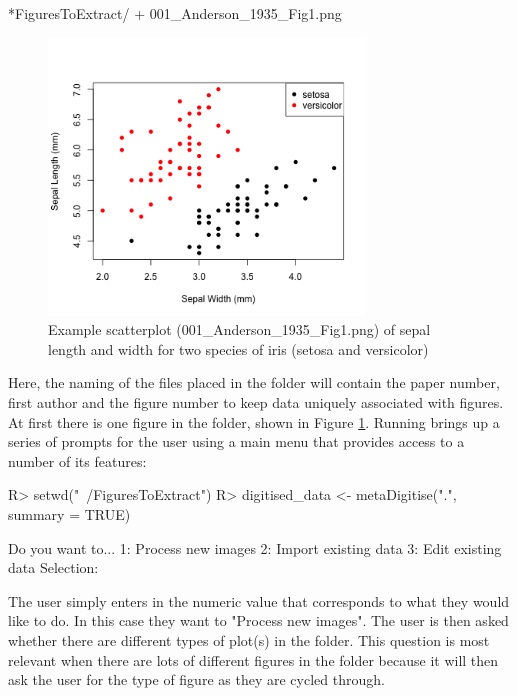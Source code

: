 \documentclass[article]{jss}
\newcommand{\fct}[1]{\code{#1()}}
\begin{document}
\begin{CodeChunk}
\begin{CodeOutput}
*FiguresToExtract/
    + 001_Anderson_1935_Fig1.png
\end{CodeOutput}
\end{CodeChunk}

\begin{figure}[!h] 
 \includegraphics[width=0.75\textwidth]{001_Anderson_1935_Fig1.png} 
 \caption{Example scatterplot (001\_Anderson\_1935\_Fig1.png) of sepal length and width for two species of iris (setosa and versicolor)}
\label{fig:Anderson}
\end{figure}

Here, the naming of the files placed in the folder will contain the paper number, first author and the figure number to keep data uniquely associated with figures. At first there is one figure in the folder, shown in Figure \ref{fig:Anderson}. Running \fct{metaDigitise} brings up a series of prompts for the user using a main menu that provides access to a number of its features: 

\begin{CodeChunk}
\begin{CodeInput}
R> setwd("~/FiguresToExtract")
R> digitised_data <- metaDigitise(".", summary = TRUE)
\end{CodeInput}
\begin{CodeOutput}
	Do you want to...
1: Process new images
2: Import existing data
3: Edit existing data
Selection: 
\end{CodeOutput}
\end{CodeChunk}

The user simply enters in the numeric value that corresponds to what they would like to do. In this case they want to "Process new images". The user is then asked whether there are different types of plot(s) in the folder. This question is most relevant when there are lots of different figures in the folder because it will then ask the user for the type of figure as they are cycled through.
\end{document}
